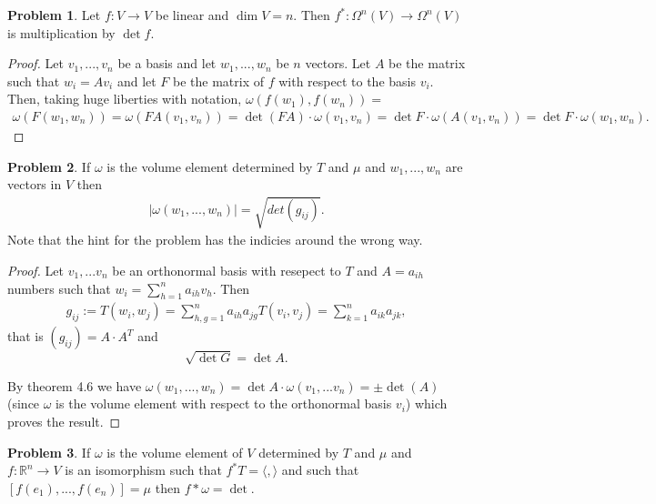 \documentclass[20pt]{article}
\theoremstyle{plain}
\theoremstyle{definition}
\newtheorem*{problem}{Problem}
\newcommand{\reals}{\mathbb{R}}
\begin{document}
  \begin{problem}{4.2}
    Let $f: V \to V$ be linear and $\dim V = n$.
    Then $f^*: \Omega^n(V) \to \Omega^n(V)$ is multiplication by $\det f$.
  \end{problem}

  \begin{proof}
    Let $v_1, ..., v_n$ be a basis and let $w_1, ..., w_n$ be $n$ vectors.
    Let $A$ be the matrix such that $w_i = Av_i$ and let $F$ be the matrix
    of $f$ with respect to the basis $v_i$.  Then, taking huge liberties with
    notation, $\omega(f(w_1), f(w_n)) = $
    \begin{align*}
      \omega(F(w_1,w_n)) =
      \omega(FA(v_1,v_n)) =
      \det(FA)\cdot \omega(v_1, v_n) =
      \det F \cdot \omega(A(v_1, v_n)) =
      \det F \cdot \omega(w_1, w_n).
    \end{align*}
  \end{proof}


  \begin{problem}{4.3}
    If $\omega$ is the volume element determined by $T$ and $\mu$ and $w_1, ..., w_n$ are vectors in $V$ then
    \begin{align*}
      |\omega(w_1, ..., w_n)| = \sqrt{det(g_{ij})}.
    \end{align*}
    \color{Blue}
    Note that the hint for the problem has the indicies around the wrong way.
  \end{problem}
  \begin{proof}
    Let $v_1, ...v_n$ be an orthonormal basis with resepect to $T$ and $A = a_{ih}$ numbers such that
    $w_i = \sum_{h=1}^n a_{ih}v_h$.
    Then
    \begin{align*}
      g_{ij} := T(w_i, w_j) = \sum_{h,g=1}^n a_{ih}a_{jg}T(v_i, v_j) = \sum_{k=1}^n a_{ik}a_{jk},
    \end{align*}
    that is $(g_{ij}) = A\cdot A^T$ and
    $$\sqrt{\det G} = \det A.$$

    By theorem 4.6 we have
    $ \omega(w_1, ..., w_n) = \det A \cdot \omega(v_1, ...v_n) = \pm \det(A)$
    (since $\omega$ is the volume element with respect to the orthonormal basis $v_i$) which proves the result.
  \end{proof}



\begin{problem}{4.4}
  If $\omega$ is the volume element of $V$ determined by $T$ and $\mu$ and
  $f: \reals^n \to V$ is an isomorphism such that $f^*T = \langle, \rangle$ and such that
  $[f(e_1), ..., f(e_n)] = \mu$ then $f*\omega = \det.$
\end{problem}
\end{document}
